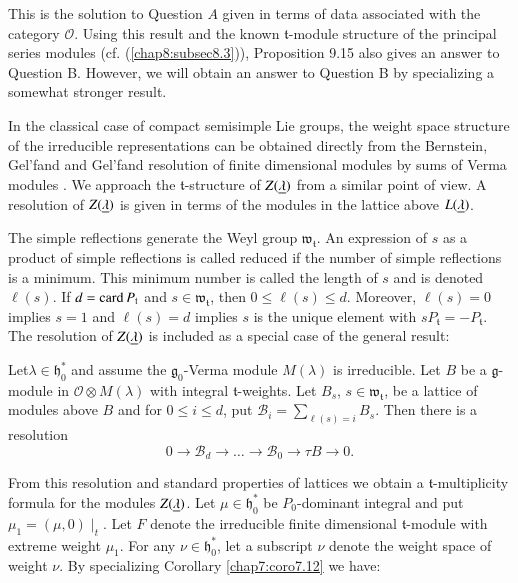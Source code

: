 This is the solution to Question $A$ given in terms of data associated
with the category $\mathscr{O}$. Using this result and the known
$\mathfrak{t}$-module structure of the principal series modules
(cf. (\ref{chap8:subsec8.3})), Proposition 9.15 also gives an answer
to Question B. However, we will obtain an answer to Question B by
specializing a somewhat stronger result. 

In the classical case of compact semisimple Lie groups, the weight
space structure of the irreducible representations can be obtained
directly from the Bernstein, Gel'fand and Gel'fand resolution of
finite dimensional modules by sums of Verma modules \cite{key1}. We
approach the $\mathfrak{t}$-structure of $Z(\underline{\lambda})$ from a
similar point of view. A resolution of $Z(\underline{\lambda})$ is given in
terms of the modules in the lattice above $L(\underline{\lambda})$.

The simple reflections generate the Weyl group
$\mathfrak{w}_\mathfrak{t}$. An expression of  $s$ as a product of
simple reflections is called reduced if the number of simple
reflections is a minimum. This minimum number is called the length of
$s$ and is denoted $\ell(s)$. If $d = \operatorname{card}  P_\mathfrak{t}$ and $s
\in \mathfrak{w}_\mathfrak{t}$, then $0 \leq \ell (s) \leq
d$. Moreover, $\ell(s) = 0$ implies $s = 1$ and $\ell(s) =d$ implies
$s$ is the unique element with $sP_\mathfrak{t} = -
P_\mathfrak{t}$. The resolution of $Z(\underline{\lambda})$ is included as a
special case of the general result: 

\medskip
{}
Let\pageoriginale $\lambda \in \mathfrak{h}^*_0$ and assume the
$\mathfrak{g}_0$-Verma module $M(\lambda)$ is irreducible. Let $B$ be
a $\mathfrak{g}$-module in $\mathscr{O} \otimes M(\lambda)$ with
integral $\mathfrak{t}$-weights. Let $B_s$, $s \in
\mathfrak{w}_\mathfrak{t}$, be a lattice of modules above $B$ and for
$0 \leq i \leq d$, put $\mathscr{B}_i = \sum\limits_{\ell(s)=i}
B_s$. Then there is a resolution
$$
0 \to \mathscr{B}_d \to \ldots \to \mathscr{B}_0 \to \tau B \to 0.
$$

From this resolution and standard properties of lattices we obtain a
$\mathfrak{t}$-multiplicity formula for the modules
$Z(\underline{\lambda})$. Let $\mu \in \mathfrak{h}^*_0$ be $P_0$-dominant
integral and put $\mu_1 = (\mu,0) \mid_t$. Let $F$ denote the
irreducible finite dimensional $ \mathfrak{t}$-module with extreme
weight $\mu_1$. For any $\nu \in  \mathfrak{h}^*_0$, let a subscript
$\nu$ denote the weight space of weight $\nu$. By specializing
Corollary \ref{chap7:coro7.12} we have:

